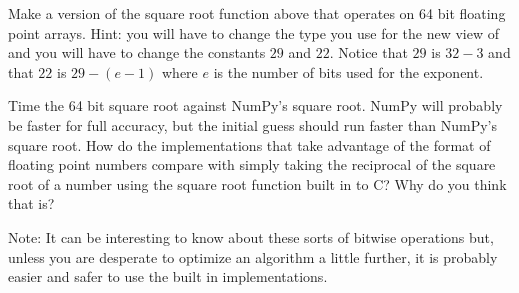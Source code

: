\begin{problem}
Make a version of the square root function above that operates on 64 bit floating point arrays.
Hint: you will have to change the type you use for the new view of  and you will have to change the constants $29$ and $22$.
Notice that $29$ is $32-3$ and that $22$ is $29-(e-1)$ where $e$ is the number of bits used for the exponent.

Time the 64 bit square root against NumPy's square root.
NumPy will probably be faster for full accuracy, but the initial guess should run faster than NumPy's square root.
How do the implementations that take advantage of the format of floating point numbers compare with simply taking the reciprocal of the square root of a number using the square root function built in to C?
Why do you think that is?
\end{problem}

Note: It can be interesting to know about these sorts of bitwise operations but, unless you are desperate to optimize an algorithm a little further, it is probably easier and safer to use the built in implementations.